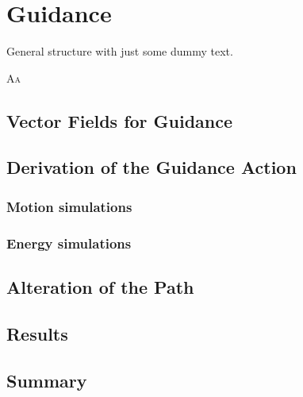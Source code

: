 
\chapter{Guidance}
\label{cp:gd}

\begin{highlight}
    \begin{st}
        General structure with just some dummy text.
    \end{st} 
\end{highlight}

\lettrine{A}{a}


\section{Vector Fields for Guidance}


\section{Derivation of the Guidance Action}

\subsection{Motion simulations}

\subsection{Energy simulations}


\section{Alteration of the Path}


\section{Results}


\section{Summary}

